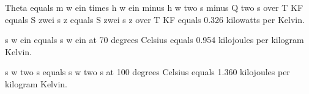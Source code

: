 Theta equals m w ein times h w ein minus h w two s minus Q two s over T KF equals S zwei s z equals S zwei s z over T KF equals 0.326 kilowatts per Kelvin.

s w ein equals s w ein at 70 degrees Celsius equals 0.954 kilojoules per kilogram Kelvin.

s w two s equals s w two s at 100 degrees Celsius equals 1.360 kilojoules per kilogram Kelvin.